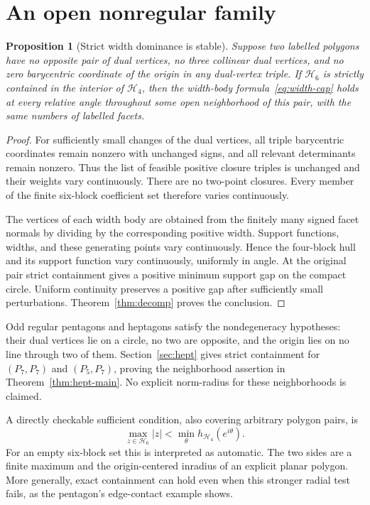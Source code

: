 \documentclass[11pt,a4paper]{article}
\newtheorem{proposition}[theorem]{Proposition}
\theoremstyle{definition}\newtheorem{definition}[theorem]{Definition}
\theoremstyle{remark}\newtheorem{remark}[theorem]{Remark}
\newcommand{\Hfour}{\mathcal H_4}
\newcommand{\Hsix}{\mathcal H_6}
\begin{document}
\section{An open nonregular family}\label{sec:stable}
\begin{proposition}[Strict width dominance is stable]\label{prop:stable}
Suppose two labelled polygons have no opposite pair of dual vertices, no three collinear dual vertices, and no zero barycentric coordinate of the origin in any dual-vertex triple. If $\Hsix$ is strictly contained in the interior of $\Hfour$, then the width-body formula~\eqref{eq:width-cap} holds at every relative angle throughout some open neighborhood of this pair, with the same numbers of labelled facets.
\end{proposition}
\begin{proof}
For sufficiently small changes of the dual vertices, all triple barycentric coordinates remain nonzero with unchanged signs, and all relevant determinants remain nonzero. Thus the list of feasible positive closure triples is unchanged and their weights vary continuously. There are no two-point closures. Every member of the finite six-block coefficient set therefore varies continuously.

The vertices of each width body are obtained from the finitely many signed facet normals by dividing by the corresponding positive width. Support functions, widths, and these generating points vary continuously. Hence the four-block hull and its support function vary continuously, uniformly in angle. At the original pair strict containment gives a positive minimum support gap on the compact circle. Uniform continuity preserves a positive gap after sufficiently small perturbations. Theorem~\ref{thm:decomp} proves the conclusion.
\end{proof}

Odd regular pentagons and heptagons satisfy the nondegeneracy hypotheses: their dual vertices lie on a circle, no two are opposite, and the origin lies on no line through two of them. Section~\ref{sec:hept} gives strict containment for $(P_7,P_7)$ and $(P_5,P_7)$, proving the neighborhood assertion in Theorem~\ref{thm:hept-main}. No explicit norm-radius for these neighborhoods is claimed.

A directly checkable sufficient condition, also covering arbitrary polygon pairs, is
\[
 \max_{z\in\Hsix}|z|<\min_{\theta}h_{\Hfour}(e^{i\theta}).
\]
For an empty six-block set this is interpreted as automatic. The two sides are a finite maximum and the origin-centered inradius of an explicit planar polygon. More generally, exact containment can hold even when this stronger radial test fails, as the pentagon's edge-contact example shows.
\end{document}
